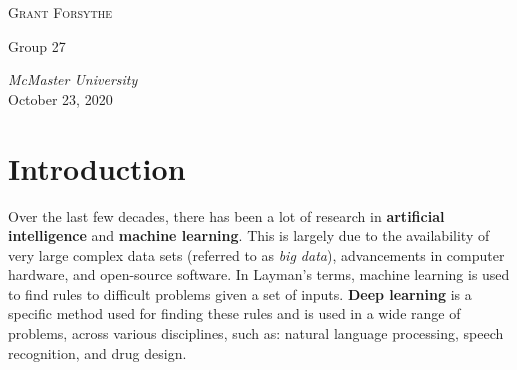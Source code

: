 \documentclass[12pt]{article}
\begin{document}
\begin{titlepage}
\begin{center}
	{\scshape\Large Grant Forsythe\\} %
	
 	\vspace{0.5\baselineskip} %
	
 	Group 27\\ %
	
	\vspace{0.5\baselineskip} %
	
	\textit{McMaster University}\\ %
	
	\vspace{0.75\baselineskip}
	October 23, 2020
	\end{center}
	
\end{titlepage}



\clearpage



\newpage
\section*{Introduction}
Over the last few decades, there has been a lot of research in \textbf{artificial intelligence} and \textbf{machine learning}. This is largely due to the availability of very large complex data sets (referred to as \textit{big data}), advancements in computer hardware, and open-source software. In Layman's terms, machine learning is used to find rules to difficult problems given a set of inputs\cite{pythondeeplearning}. \textbf{Deep learning} is a specific method used for finding these rules and is used in a wide range of problems, across various disciplines, such as: natural language processing, speech recognition,  and drug design.
\end{document}
